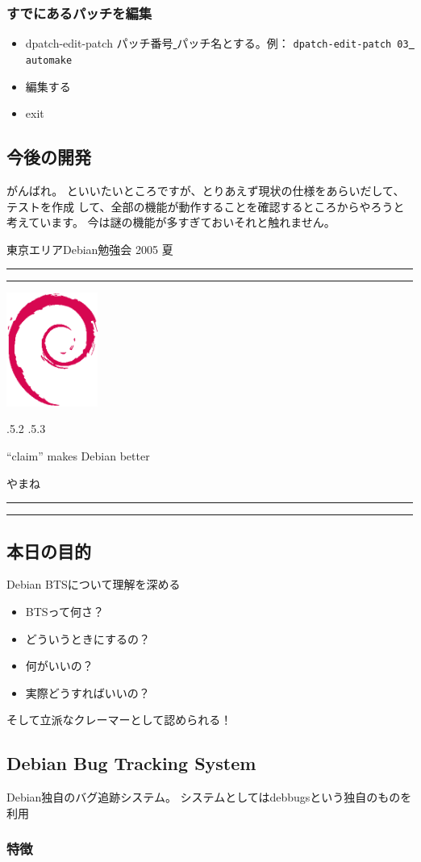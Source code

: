 \documentclass[mingoth,a4paper]{jsarticle}
\makeatletter
\renewcommand{\section}{\@startsection{section}{1}{\z@}%
    {\Cvs \@plus.5\Cdp \@minus.2\Cdp}%
    {.5\Cvs \@plus.3\Cdp}%
    {\normalfont\Large\headfont\raggedright\centering}} %
\newcommand{\dancersection}[2]{%
\newpage
東京エリアDebian勉強会 2005 夏
\hrule
\vspace{0.5mm}
\hrule
\hfill{}\includegraphics[width=3cm]{image200502/openlogo-nd.eps}\\
\vspace{-4cm}
\begin{center}
  \section{#1}
\end{center}
\hfill{}#2\hspace{3cm}\space\\
\hrule
\hrule
\vspace{1cm}
}
\makeatother
\begin{document}
\subsubsection{すでにあるパッチを編集}

\begin{itemize}
     \item  dpatch-edit-patch パッチ番号\underline{ }パッチ名とする。例：
{\tt  dpatch-edit-patch 03\underline{ }automake}
    \item 編集する
    \item exit
\end{itemize}

\subsection{今後の開発}

がんばれ。
といいたいところですが、とりあえず現状の仕様をあらいだして、テストを作成
して、全部の機能が動作することを確認するところからやろうと考えています。
今は謎の機能が多すぎておいそれと触れません。

\dancersection{``claim'' makes Debian better}
{やまね}

\subsection{本日の目的}

Debian BTSについて理解を深める

\begin{itemize}
\item BTSって何さ？
\item どういうときにするの？
\item 何がいいの？
\item 実際どうすればいいの？
\end{itemize}

そして立派なクレーマーとして認められる！

\subsection{Debian Bug Tracking System}

Debian独自のバグ追跡システム。
システムとしてはdebbugsという独自のものを利用

\subsubsection*{特徴}
\end{document}
